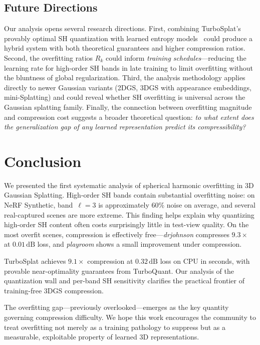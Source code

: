 \documentclass[sigconf,review]{acmart}
\newcommand{\ours}{TurboSplat}
\newcommand{\dB}{\,\text{dB}}
\newcommand{\R}[1]{R_{#1}}
\begin{document}
\subsection{Future Directions}
\label{sec:future}

Our analysis opens several research directions.
First, combining \ours{}'s provably optimal SH quantization with learned entropy models~\cite{entropygs2025, chen2024fcgs} could produce a hybrid system with both theoretical guarantees and higher compression ratios.
Second, the overfitting ratios $\R{k}$ could inform \emph{training schedules}---reducing the learning rate for high-order SH bands in late training to limit overfitting without the bluntness of global regularization.
Third, the analysis methodology applies directly to newer Gaussian variants (2DGS, 3DGS with appearance embeddings, mini-Splatting) and could reveal whether SH overfitting is universal across the Gaussian splatting family.
Finally, the connection between overfitting magnitude and compression cost suggests a broader theoretical question: \emph{to what extent does the generalization gap of any learned representation predict its compressibility?}

\section{Conclusion}
\label{sec:conclusion}

We presented the first systematic analysis of spherical harmonic overfitting in 3D Gaussian Splatting.
High-order SH bands contain substantial overfitting noise: on NeRF Synthetic, band~$\ell{=}3$ is approximately 60\% noise on average, and several real-captured scenes are more extreme.
This finding helps explain why quantizing high-order SH content often costs surprisingly little in test-view quality.
On the most overfit scenes, compression is effectively free---\textit{drjohnson} compresses $9.3{\times}$ at $0.01\dB$ loss, and \textit{playroom} shows a small improvement under compression.

\ours{} achieves $9.1{\times}$ compression at $0.32\dB$ loss on CPU in seconds, with provable near-optimality guarantees from TurboQuant.
Our analysis of the quantization wall and per-band SH sensitivity clarifies the practical frontier of training-free 3DGS compression.

The overfitting gap---previously overlooked---emerges as the key quantity governing compression difficulty.
We hope this work encourages the community to treat overfitting not merely as a training pathology to suppress but as a measurable, exploitable property of learned 3D representations.
\end{document}
